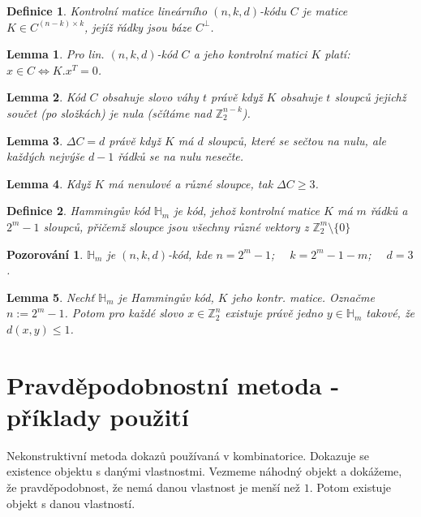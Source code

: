 \documentclass[a4paper,10pt,titlepage]{article} \usepackage[utf8]{inputenc}
\newtheorem{define}{Definice}
\newtheorem*{observ}{Pozorování}
\newtheorem*{lemma}{Lemma}
\begin{document}
\begin{define}
Kontrolní matice lineárního $(n,k,d)$-kódu $C$ je matice $K \in C^{(n-k) \times k}$, jejíž řádky jsou báze $C^\bot$.
\end{define}

\begin{lemma}
Pro lin. $(n,k,d)$-kód $C$ a jeho kontrolní matici $K$ platí: $x \in C \Longleftrightarrow K.x^T = 0$.
\end{lemma}

\begin{lemma}
Kód $C$ obsahuje slovo váhy $t$ právě když $K$ obsahuje $t$ sloupců jejichž součet (po složkách) je nula (sčítáme nad $\mathbb{Z}^{n-k}_2$).
\end{lemma}

\begin{lemma}
$\Delta C = d$ právě když $K$ má $d$ sloupců, které se sečtou na nulu, ale každých nejvýše $d-1$ řádků se na nulu nesečte.
\end{lemma}

\begin{lemma}
Když $K$ má nenulové a různé sloupce, tak $\Delta C \geq 3$.
\end{lemma}

\begin{define}
Hammingův kód $\mathbb{H}_m$ je kód, jehož kontrolní matice $K$ má $m$ řádků a $2^m-1$ sloupců, přičemž sloupce jsou všechny různé vektory z $\mathbb{Z}^{m}_2 \setminus \{0\}$
\end{define}

\begin{observ}
$\mathbb{H}_m$ je $(n,k,d)$-kód, kde $n=2^m-1$; $\quad k=2^m-1-m$; $\quad d=3$.
\end{observ}

\begin{lemma}
Nechť $\mathbb{H}_m$ je Hammingův kód, $K$ jeho kontr. matice. Označme $n := 2^m-1$. Potom pro každé slovo $x \in \mathbb{Z}^{n}_2$ existuje právě jedno $y \in \mathbb{H}_m$ takové, že $d(x,y) \leq 1$.
\end{lemma}

\medskip

\section{Pravděpodobnostní metoda - příklady použití}

Nekonstruktivní metoda dokazů používaná v kombinatorice.
Dokazuje se existence objektu s danými vlastnostmi.
Vezmeme náhodný objekt a dokážeme, že pravděpodobnost, že nemá danou vlastnost je menší než $1$.
Potom existuje objekt s danou vlastností.
\end{document}
